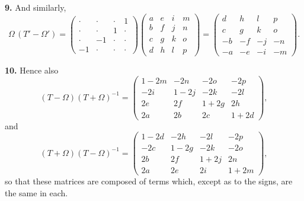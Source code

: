 \documentclass[11pt]{article}
\begin{document}
\textbf{9.} And similarly,
\[
\Omega\,(T' - \Omega') = \begin{pmatrix} \cdot & \cdot & \cdot & 1 \\ \cdot & \cdot & 1 & \cdot \\ \cdot & -1 & \cdot & \cdot \\ -1 & \cdot & \cdot & \cdot \end{pmatrix}
\begin{pmatrix} a & e & i & m \\ b & f & j & n \\ c & g & k & o \\ d & h & l & p \end{pmatrix}
= \begin{pmatrix} d & h & l & p \\ c & g & k & o \\ -b & -f & -j & -n \\ -a & -e & -i & -m \end{pmatrix}.
\]

\textbf{10.} Hence also
\[
(T - \Omega)(T + \Omega)^{-1} = \begin{pmatrix} 1 - 2m & -2n & -2o & -2p \\ -2i & 1 - 2j & -2k & -2l \\ 2e & 2f & 1 + 2g & 2h \\ 2a & 2b & 2c & 1 + 2d \end{pmatrix},
\]
and
\[
(T + \Omega)(T - \Omega)^{-1} = \begin{pmatrix} 1 - 2d & -2h & -2l & -2p \\ -2c & 1 - 2g & -2k & -2o \\ 2b & 2f & 1 + 2j & 2n \\ 2a & 2e & 2i & 1 + 2m \end{pmatrix},
\]
so that these matrices are composed of terms which, except as to the signs, are the same in each.
\end{document}
